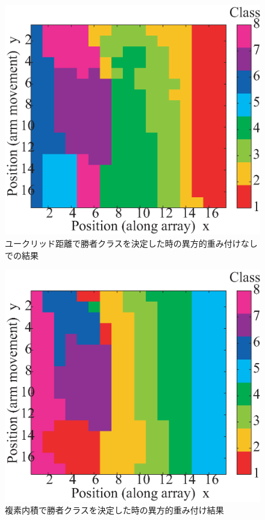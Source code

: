 ﻿\documentclass[12pt,oneside]{jsbook}
\begin{document}
\begin{figure}[btp]
\includegraphics[width =\hsize ]{SOM_mine6_02005_e_raw.eps}
\caption{ユークリッド距離で勝者クラスを決定した時の異方的重み付けなしでの結果}
\label{iso-e}
\end{figure}

\begin{figure}[btp]
\includegraphics[width =\hsize ]{SOM_mine6_02005_i_wsqrt.eps}
\caption{複素内積で勝者クラスを決定した時の異方的重み付け結果}
\label{aniso-i}
\end{figure}
\end{document}
